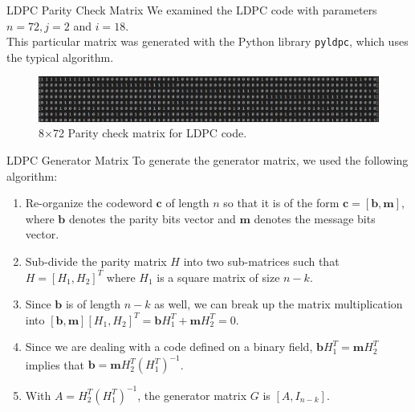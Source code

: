 \documentclass{beamer}
\begin{document}
\begin{frame}{LDPC Parity Check Matrix}
  We examined the LDPC code with parameters $n=72, j=2$ and $i=18$.\\
  \medskip
  This particular matrix was generated with the Python library \texttt{pyldpc}, which uses the typical algorithm.

  \begin{figure}[htbp]
      \centerline{\includegraphics[scale = 0.4]{Images/LDPC_Parity_Matrix.jpg}}
      \caption{8$\times$72 Parity check matrix for LDPC code.}
  \end{figure}
\end{frame}

\begin{frame}{LDPC Generator Matrix}
    To generate the generator matrix, we used the following algorithm:
    \begin{enumerate}
      \item Re-organize the codeword $\textbf{c}$ of length $n$ so that it is of the form $\textbf{c} = [\textbf{b}, \textbf{m}]$, where $\textbf{b}$ denotes the parity bits vector and $\textbf{m}$ denotes the message bits vector.
      \item Sub-divide the parity matrix $H$ into two sub-matrices such that $H = [H_1, H_2]^T$ where $H_1$ is a square matrix of size $n-k$.
      \item Since $\textbf{b}$ is of length $n-k$ as well, we can break up the matrix
    multiplication into $[\textbf{b}, \textbf{m}][H_1, H_2]^T = \textbf{b}H_1^T + \textbf{m}H_2^T = 0$.
    \item Since we are dealing with a code defined on a binary field, $\textbf{b}H_1^T = \textbf{m}H_2^T$ implies that $\textbf{b}= \textbf{m}H_2^T(H_1^T)^{-1}$.
    \item With $A = H_2^T(H_1^T)^{-1}$, the generator matrix $G$ is $[A, I_{n-k}]$.
    \end{enumerate}
\end{frame}
\end{document}
